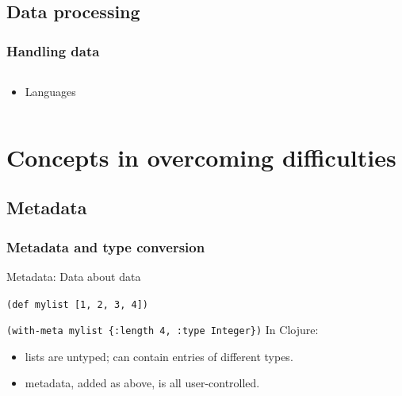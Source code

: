 \documentclass{beamer}
\newcommand{\linespace}{\vskip 0.25cm}
\begin{document}
\subsection{Data processing}
\begin{frame}
  \frametitle{Handling data}
  
  \begin{columns}
  \begin{column}{0.5\textwidth}
  \begin{itemize}
  \item Languages 
  \end{itemize}
  \end{column}
  \end{columns}
\end{frame}

\section[Handling interop]{Concepts in overcoming difficulties}

\subsection{Metadata}

\begin{frame}
  \frametitle{Metadata and type conversion}

	Metadata: Data about data
	
	{\tt (def mylist [1, 2, 3, 4])}
	
	{\tt (with-meta mylist \{:length 4, :type Integer\})}
	\linespace
	In Clojure:
	\begin{itemize}
	\item lists are untyped; can contain entries of different types.
	\item metadata, added as above, is all user-controlled.
	\end{itemize}
\end{frame}
\end{document}
